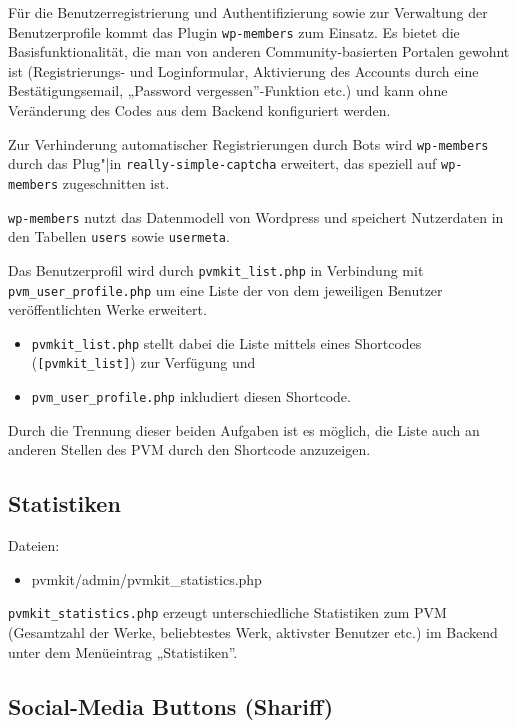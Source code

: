 \documentclass[a4paper,11pt]{article}
\begin{document}
Für die Benutzerregistrierung und Authentifizierung sowie zur Verwaltung der
Benutzerprofile kommt das Plugin \texttt{wp-members} zum Einsatz. Es bietet
die Basisfunktionalität, die man von anderen Community-basierten Portalen
gewohnt ist (Registrierungs- und Loginformular, Aktivierung des Accounts durch
eine Bestätigungsemail, „Password vergessen”-Funktion etc.)  und kann ohne
Veränderung des Codes aus dem Backend konfiguriert werden.
 
Zur Verhinderung automatischer Registrierungen durch Bots wird
\texttt{wp-members} durch das Plug"|in \texttt{really-simple-captcha}
erweitert, das speziell auf \texttt{wp-members} zugeschnitten ist.
 
\texttt{wp-members} nutzt das Datenmodell von Wordpress und speichert
Nutzerdaten in den Tabellen \texttt{users} sowie \texttt{usermeta}.
 
Das Benutzerprofil wird durch \texttt{pvmkit\_list.php} in Verbindung mit
\texttt{pvm\_user\_profile.php} um eine Liste der von dem jeweiligen Benutzer
veröffentlichten Werke erweitert. 
\begin{itemize}
\item \texttt{pvmkit\_list.php} stellt dabei die Liste mittels eines
  Shortcodes (\texttt{[pvmkit\_list]}) zur Verfügung und
\item \texttt{pvm\_user\_profile.php} inkludiert diesen Shortcode.  
\end{itemize}
Durch die Trennung dieser beiden Aufgaben ist es möglich, die Liste auch an
anderen Stellen des PVM durch den Shortcode anzuzeigen.
 
\subsection{Statistiken}
 
Dateien:  
\begin{itemize}\itemsep0pt\tt
\item pvmkit/admin/pvmkit\_statistics.php 
\end{itemize}

\texttt{pvmkit\_statistics.php} erzeugt unterschiedliche Statistiken zum PVM
(Gesamtzahl der Werke, beliebtestes Werk, aktivster Benutzer etc.) im Backend
unter dem Menüeintrag „Statistiken”.
 
\subsection{Social-Media Buttons (Shariff)}
 
\end{document}
